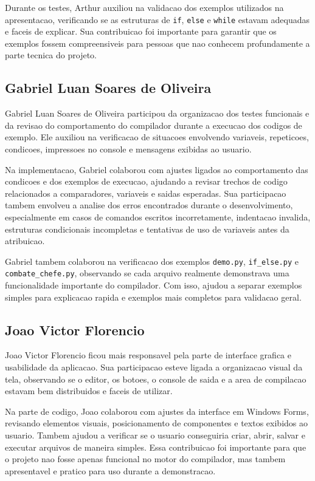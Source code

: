 \documentclass[12pt,a4paper]{article}
\begin{document}
Durante os testes, Arthur auxiliou na validacao dos exemplos utilizados na apresentacao, verificando se as estruturas de \texttt{if}, \texttt{else} e \texttt{while} estavam adequadas e faceis de explicar. Sua contribuicao foi importante para garantir que os exemplos fossem compreensiveis para pessoas que nao conhecem profundamente a parte tecnica do projeto.

\subsection*{Gabriel Luan Soares de Oliveira}

Gabriel Luan Soares de Oliveira participou da organizacao dos testes funcionais e da revisao do comportamento do compilador durante a execucao dos codigos de exemplo. Ele auxiliou na verificacao de situacoes envolvendo variaveis, repeticoes, condicoes, impressoes no console e mensagens exibidas ao usuario.

Na implementacao, Gabriel colaborou com ajustes ligados ao comportamento das condicoes e dos exemplos de execucao, ajudando a revisar trechos de codigo relacionados a comparadores, variaveis e saidas esperadas. Sua participacao tambem envolveu a analise dos erros encontrados durante o desenvolvimento, especialmente em casos de comandos escritos incorretamente, indentacao invalida, estruturas condicionais incompletas e tentativas de uso de variaveis antes da atribuicao.

Gabriel tambem colaborou na verificacao dos exemplos \texttt{demo.py}, \texttt{if\_else.py} e \texttt{combate\_chefe.py}, observando se cada arquivo realmente demonstrava uma funcionalidade importante do compilador. Com isso, ajudou a separar exemplos simples para explicacao rapida e exemplos mais completos para validacao geral.

\subsection*{Joao Victor Florencio}

Joao Victor Florencio ficou mais responsavel pela parte de interface grafica e usabilidade da aplicacao. Sua participacao esteve ligada a organizacao visual da tela, observando se o editor, os botoes, o console de saida e a area de compilacao estavam bem distribuidos e faceis de utilizar.

Na parte de codigo, Joao colaborou com ajustes da interface em Windows Forms, revisando elementos visuais, posicionamento de componentes e textos exibidos ao usuario. Tambem ajudou a verificar se o usuario conseguiria criar, abrir, salvar e executar arquivos de maneira simples. Essa contribuicao foi importante para que o projeto nao fosse apenas funcional no motor do compilador, mas tambem apresentavel e pratico para uso durante a demonstracao.
\end{document}
